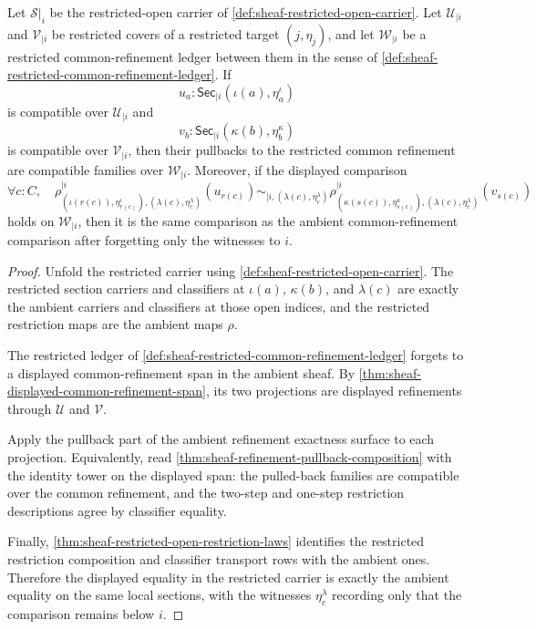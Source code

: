 \begin{theorem}
\label{thm:sheaf-restricted-common-refinement-pullback-compatibility}
Let $\mathcal{S}|_i$ be the restricted-open carrier of \autoref{def:sheaf-restricted-open-carrier}. Let $\mathcal{U}_{|i}$ and $\mathcal{V}_{|i}$ be restricted covers of a restricted target $(j,\eta_j)$, and let $\mathcal{W}_{|i}$ be a restricted common-refinement ledger between them in the sense of \autoref{def:sheaf-restricted-common-refinement-ledger}. If
$$
u_a:\mathsf{Sec}_{|i}(\iota(a),\eta^\iota_a)
$$
is compatible over $\mathcal{U}_{|i}$ and
$$
v_b:\mathsf{Sec}_{|i}(\kappa(b),\eta^\kappa_b)
$$
is compatible over $\mathcal{V}_{|i}$, then their pullbacks to the restricted common refinement are compatible families over $\mathcal{W}_{|i}$. Moreover, if the displayed comparison
$$
\forall c:C,\quad
\rho^{|i}_{(\iota(r(c)),\eta^\iota_{r(c)}),(\lambda(c),\eta^\lambda_c)}(u_{r(c)})
\sim_{|i,(\lambda(c),\eta^\lambda_c)}
\rho^{|i}_{(\kappa(s(c)),\eta^\kappa_{s(c)}),(\lambda(c),\eta^\lambda_c)}(v_{s(c)})
$$
holds on $\mathcal{W}_{|i}$, then it is the same comparison as the ambient common-refinement comparison after forgetting only the witnesses to $i$.
\end{theorem}
\begin{proof}
Unfold the restricted carrier using \autoref{def:sheaf-restricted-open-carrier}. The restricted section carriers and classifiers at $\iota(a)$, $\kappa(b)$, and $\lambda(c)$ are exactly the ambient carriers and classifiers at those open indices, and the restricted restriction maps are the ambient maps $\rho$.

The restricted ledger of \autoref{def:sheaf-restricted-common-refinement-ledger} forgets to a displayed common-refinement span in the ambient sheaf. By \autoref{thm:sheaf-displayed-common-refinement-span}, its two projections are displayed refinements through $\mathcal{U}$ and $\mathcal{V}$.

Apply the pullback part of the ambient refinement exactness surface to each projection. Equivalently, read \autoref{thm:sheaf-refinement-pullback-composition} with the identity tower on the displayed span: the pulled-back families are compatible over the common refinement, and the two-step and one-step restriction descriptions agree by classifier equality.

Finally, \autoref{thm:sheaf-restricted-open-restriction-laws} identifies the restricted restriction composition and classifier transport rows with the ambient ones. Therefore the displayed equality in the restricted carrier is exactly the ambient equality on the same local sections, with the witnesses $\eta^\lambda_c$ recording only that the comparison remains below $i$.
\end{proof}

